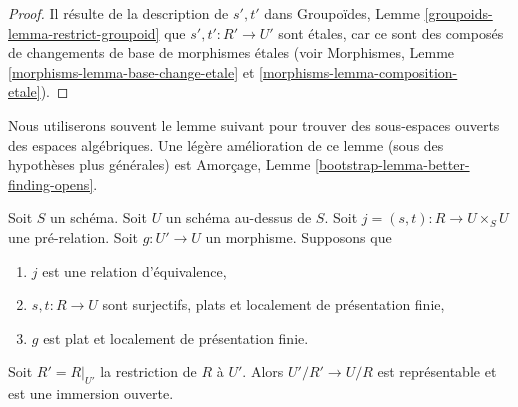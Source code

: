 \begin{proof}
Il résulte de la description de $s', t'$ dans
Groupoïdes, Lemme \ref{groupoids-lemma-restrict-groupoid}
que $s' , t' : R' \to U'$ sont \'etales,
car ce sont des composés de changements de base de morphismes \'etales
(voir Morphismes, Lemme \ref{morphisms-lemma-base-change-etale}
et \ref{morphisms-lemma-composition-etale}).
\end{proof}

\noindent
Nous utiliserons souvent le lemme suivant pour trouver des sous-espaces ouverts des espaces
algébriques. Une légère amélioration de ce lemme (sous des hypothèses plus générales) est
Amorçage, Lemme \ref{bootstrap-lemma-better-finding-opens}.

\begin{lemma}
\label{lemma-finding-opens}
Soit $S$ un schéma.
Soit $U$ un schéma au-dessus de $S$.
Soit $j = (s, t) : R \to U \times_S U$ une pré-relation.
Soit $g : U' \to U$ un morphisme.
Supposons que
\begin{enumerate}
\item $j$ est une relation d'équivalence,
\item $s, t : R \to U$ sont surjectifs, plats et
localement de présentation finie,
\item $g$ est plat et localement de présentation finie.
\end{enumerate}
Soit $R' = R|_{U'}$ la restriction de $R$ à $U'$. Alors
$U'/R' \to U/R$ est représentable et est une immersion ouverte.
\end{lemma}

